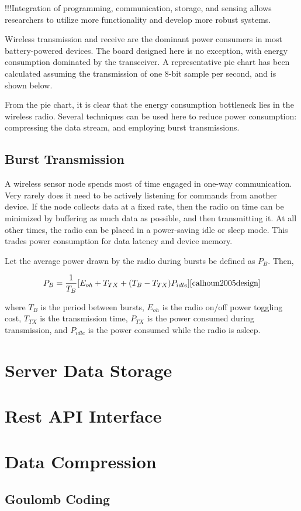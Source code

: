 !!!Integration of programming, communication, storage, and sensing allows researchers to utilize more functionality and develop more robust systems.


Wireless transmission and receive are the dominant power consumers in most battery-powered devices. The board designed here is no exception, with energy consumption dominated by the transceiver. A representative pie chart has been calculated assuming the transmission of one 8-bit sample per second, and is shown below.


From the pie chart, it is clear that the energy consumption bottleneck lies in the wireless radio. Several techniques can be used here to reduce power consumption: compressing the data stream, and employing burst transmissions.

\subsection{Burst Transmission}

A wireless sensor node spends most of time engaged in one-way communication. Very rarely does it need to be actively listening for commands from another device. If the node collects data at a fixed rate, then the radio on time can be minimized by buffering as much data as possible, and then transmitting it. At all other times, the radio can be placed in a power-saving idle or sleep mode. This trades power consumption for data latency and device memory.

Let the average power drawn by the radio during bursts be defined as $P_{B}$. Then, 

\begin{equation}
P_{B} = \frac{1}{T_{B}}[E_{oh} + T_{TX} +(T_{B}-T_{TX})P_{idle}]\cite{calhoun2005design}
\end{equation}

where $T_{B}$ is the period between bursts, $E_{oh}$ is the radio on/off power toggling cost, $T_{TX}$ is the transmission time, $P_{TX}$ is the power consumed during transmission, and $P_{idle}$ is the power consumed while the radio is asleep.



 
\section{Server Data Storage}
\section{Rest API Interface}
\section{Data Compression}
\subsection{Goulomb Coding}


